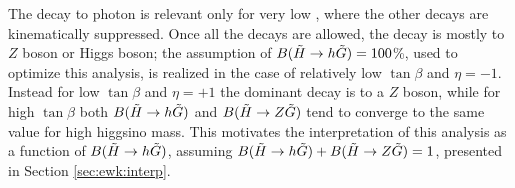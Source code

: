 The decay to photon is relevant only for very low \mhino, where the other decays are kinematically suppressed. 
Once all the decays are allowed, the decay is mostly to $Z$ boson or Higgs boson; 
the assumption of $B(\tilde{H}\rightarrow h \tilde{G}) = 100$\%, used to optimize this analysis, is 
realized in the case of relatively low $\tan \beta$ and $\eta = -1$.
Instead for low $\tan \beta$ and $\eta = +1$ the dominant decay is to a $Z$ boson, while for high 
$\tan \beta$ both $B(\tilde{H}\rightarrow h \tilde{G})$ and $B(\tilde{H}\rightarrow Z \tilde{G})$ tend to 
converge to the same value for high higgsino mass.
This motivates the interpretation of this analysis as a function of $B(\tilde{H}\rightarrow h \tilde{G})$, 
assuming $B(\tilde{H}\rightarrow h \tilde{G}) +B(\tilde{H}\rightarrow Z \tilde{G}) =1$, presented in Section \ref{sec:ewk:interp}.




